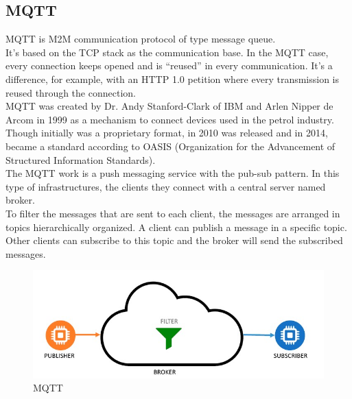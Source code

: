 \documentclass[12pt]{article}
\begin{document}
\subsection*{MQTT}
MQTT is M2M communication protocol of type message queue.\\
It's based on the TCP stack as the communication base. In the MQTT case, every connection keeps opened and is “reused” in every communication. It's a difference, for example, with an HTTP 1.0 petition where every transmission is reused through the connection.\\
MQTT was created by Dr. Andy Stanford-Clark of IBM and Arlen Nipper de Arcom in 1999 as a mechanism to connect devices used in the petrol industry.\\
Though initially was a proprietary format, in 2010 was released and in 2014, became a standard according to OASIS (Organization for the Advancement of Structured Information Standards).\\
The MQTT work is a push messaging service with the pub-sub pattern. In this type of infrastructures, the clients they connect with a central server named broker.\\
To filter the messages that are sent to each client, the messages are arranged in topics hierarchically organized. A client can publish a message in a specific topic. Other clients can subscribe to this topic and the broker will send the subscribed messages.

\begin{figure}[H]
    \centering
    \includegraphics[scale = 0.7]{Images/mqtt.jpg}
    \caption{MQTT}
    \label{fig:mqtt}
\end{figure}
\end{document}

